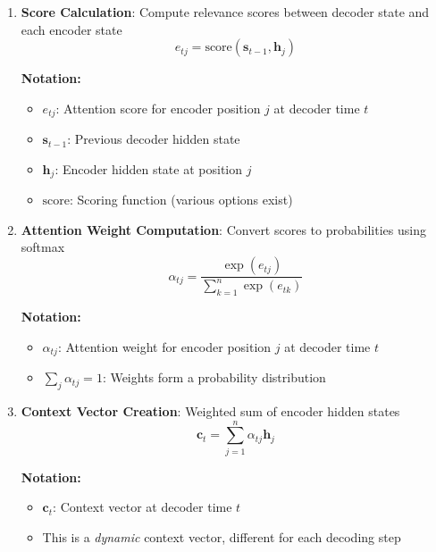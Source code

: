 \documentclass[11pt]{article}
\begin{document}
\begin{enumerate}
    \item \textbf{Score Calculation}: Compute relevance scores between decoder state and each encoder state
    \begin{equation}
    e_{tj} = \text{score}(\mathbf{s}_{t-1}, \mathbf{h}_j)
    \end{equation}
    \begin{notationbox}
    \textbf{Notation:}
    \begin{itemize}
        \item $e_{tj}$: Attention score for encoder position $j$ at decoder time $t$
        \item $\mathbf{s}_{t-1}$: Previous decoder hidden state
        \item $\mathbf{h}_j$: Encoder hidden state at position $j$
        \item $\text{score}$: Scoring function (various options exist)
    \end{itemize}
    \end{notationbox}
    
    \item \textbf{Attention Weight Computation}: Convert scores to probabilities using softmax
    \begin{equation}
    \alpha_{tj} = \frac{\exp(e_{tj})}{\sum_{k=1}^{n} \exp(e_{tk})}
    \end{equation}
    \begin{notationbox}
    \textbf{Notation:}
    \begin{itemize}
        \item $\alpha_{tj}$: Attention weight for encoder position $j$ at decoder time $t$
        \item $\sum_{j} \alpha_{tj} = 1$: Weights form a probability distribution
    \end{itemize}
    \end{notationbox}
    
    \item \textbf{Context Vector Creation}: Weighted sum of encoder hidden states
    \begin{equation}
    \mathbf{c}_t = \sum_{j=1}^{n} \alpha_{tj} \mathbf{h}_j
    \end{equation}
    \begin{notationbox}
    \textbf{Notation:}
    \begin{itemize}
        \item $\mathbf{c}_t$: Context vector at decoder time $t$
        \item This is a \textit{dynamic} context vector, different for each decoding step
    \end{itemize}
    \end{notationbox}
\end{enumerate}
\end{document}
